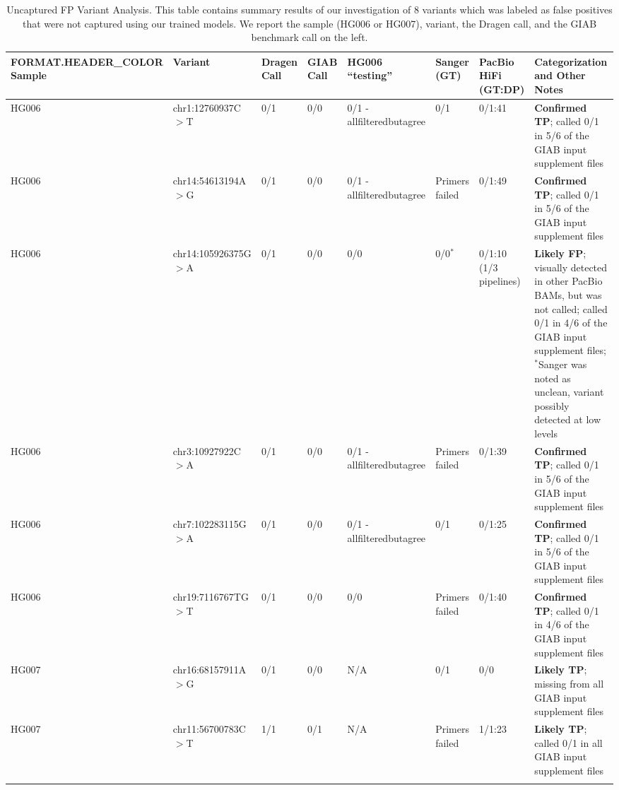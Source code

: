 \begin{landscape}

\begin{longtable}{|l|l|p{}|p{}||l|p{}|p{}|p{}|}
    \hline
    {{ FORMAT.HEADER_COLOR }}
    \textbf{Sample}&\textbf{Variant}&\textbf{Dragen Call}&\textbf{GIAB Call}&\textbf{HG006 ``testing''}&\textbf{Sanger (GT)}&\textbf{PacBio HiFi (GT:DP)}&\textbf{Categorization and Other Notes}\\ \hline
    \endhead
    HG006&chr1:12760937C$>$T&0/1&0/0&0/1 - allfilteredbutagree&0/1&0/1:41&\textbf{Confirmed TP}; called 0/1 in 5/6 of the GIAB input supplement files \\ \hline
    HG006&chr14:54613194A$>$G&0/1&0/0&0/1 - allfilteredbutagree&Primers failed&0/1:49&\textbf{Confirmed TP}; called 0/1 in 5/6 of the GIAB input supplement files \\ \hline
    HG006&chr14:105926375G$>$A&0/1&0/0&0/0&0/0$^*$&0/1:10 (1/3 pipelines)&\textbf{Likely FP}; visually detected in other PacBio BAMs, but was not called; called 0/1 in 4/6 of the GIAB input supplement files; $^*$Sanger was noted as unclean, variant possibly detected at low levels \\ \hline
    HG006&chr3:10927922C$>$A&0/1&0/0&0/1 - allfilteredbutagree&Primers failed&0/1:39&\textbf{Confirmed TP}; called 0/1 in 5/6 of the GIAB input supplement files \\ \hline
    HG006&chr7:102283115G$>$A&0/1&0/0&0/1 - allfilteredbutagree&0/1&0/1:25&\textbf{Confirmed TP}; called 0/1 in 5/6 of the GIAB input supplement files \\ \hline
    HG006&chr19:7116767TG$>$T&0/1&0/0&0/0&Primers failed&0/1:40&\textbf{Confirmed TP}; called 0/1 in 4/6 of the GIAB input supplement files \\ \hline	
    HG007&chr16:68157911A$>$G&0/1&0/0&N/A&0/1&0/0&\textbf{Likely TP}; missing from all GIAB input supplement files\\ \hline
    HG007&chr11:56700783C$>$T&1/1&0/1&N/A&Primers failed&1/1:23&\textbf{Likely TP}; called 0/1 in all GIAB input supplement files \\ \hline
    \caption{
        Uncaptured FP Variant Analysis.  
        This table contains summary results of our investigation of 8 variants which was labeled as false positives that were not captured using our trained models.
        We report the sample (HG006 or HG007), variant, the Dragen call, and the GIAB benchmark call on the left.
}
\end{longtable}
\end{landscape}
